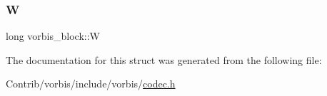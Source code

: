 \mbox{\label{structvorbis__block_a1e420440dd6a5a39262c0fe7afa8435a}} 
\subsubsection{\texorpdfstring{W}{W}}
{\footnotesize\ttfamily long vorbis\+\_\+block\+::W}



The documentation for this struct was generated from the following file\+:\begin{DoxyCompactItemize}
\item 
Contrib/vorbis/include/vorbis/\mbox{\hyperlink{codec_8h}{codec.\+h}}\end{DoxyCompactItemize}

